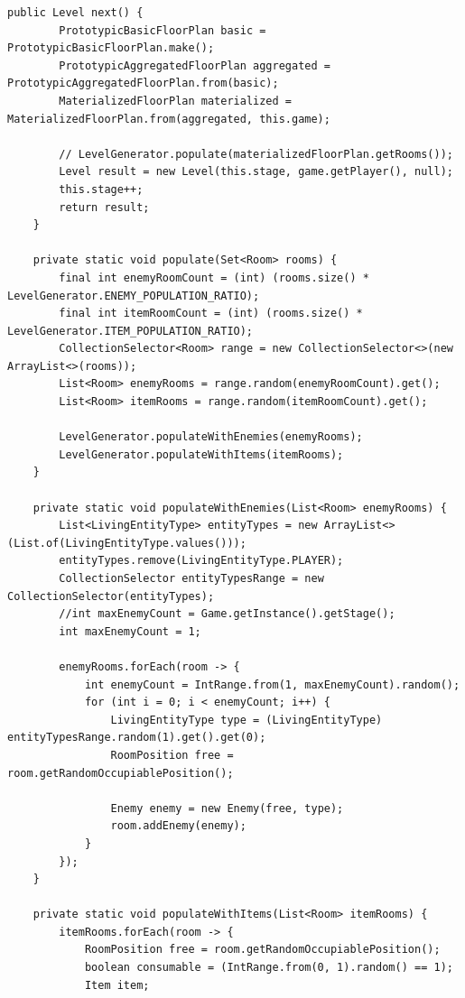 \vspace{0.5cm}
\begin{lstlisting}[caption={Code Smell: Large Class (Vorher)}]
    public Level next() {
        PrototypicBasicFloorPlan basic = PrototypicBasicFloorPlan.make();
        PrototypicAggregatedFloorPlan aggregated = PrototypicAggregatedFloorPlan.from(basic);
        MaterializedFloorPlan materialized = MaterializedFloorPlan.from(aggregated, this.game);
        
        // LevelGenerator.populate(materializedFloorPlan.getRooms());
        Level result = new Level(this.stage, game.getPlayer(), null);
        this.stage++;
        return result;
    }
    
    private static void populate(Set<Room> rooms) {
        final int enemyRoomCount = (int) (rooms.size() * LevelGenerator.ENEMY_POPULATION_RATIO);
        final int itemRoomCount = (int) (rooms.size() * LevelGenerator.ITEM_POPULATION_RATIO);
        CollectionSelector<Room> range = new CollectionSelector<>(new ArrayList<>(rooms));
        List<Room> enemyRooms = range.random(enemyRoomCount).get();
        List<Room> itemRooms = range.random(itemRoomCount).get();
        
        LevelGenerator.populateWithEnemies(enemyRooms);
        LevelGenerator.populateWithItems(itemRooms);
    }
    
    private static void populateWithEnemies(List<Room> enemyRooms) {
        List<LivingEntityType> entityTypes = new ArrayList<>(List.of(LivingEntityType.values()));
        entityTypes.remove(LivingEntityType.PLAYER);
        CollectionSelector entityTypesRange = new CollectionSelector(entityTypes);
        //int maxEnemyCount = Game.getInstance().getStage();
        int maxEnemyCount = 1;
        
        enemyRooms.forEach(room -> {
            int enemyCount = IntRange.from(1, maxEnemyCount).random();
            for (int i = 0; i < enemyCount; i++) {
                LivingEntityType type = (LivingEntityType) entityTypesRange.random(1).get().get(0);
                RoomPosition free = room.getRandomOccupiablePosition();
    
                Enemy enemy = new Enemy(free, type);
                room.addEnemy(enemy);
            }
        });
    }
    
    private static void populateWithItems(List<Room> itemRooms) {
        itemRooms.forEach(room -> {
            RoomPosition free = room.getRandomOccupiablePosition();
            boolean consumable = (IntRange.from(0, 1).random() == 1);
            Item item;
            

\end{lstlisting}
